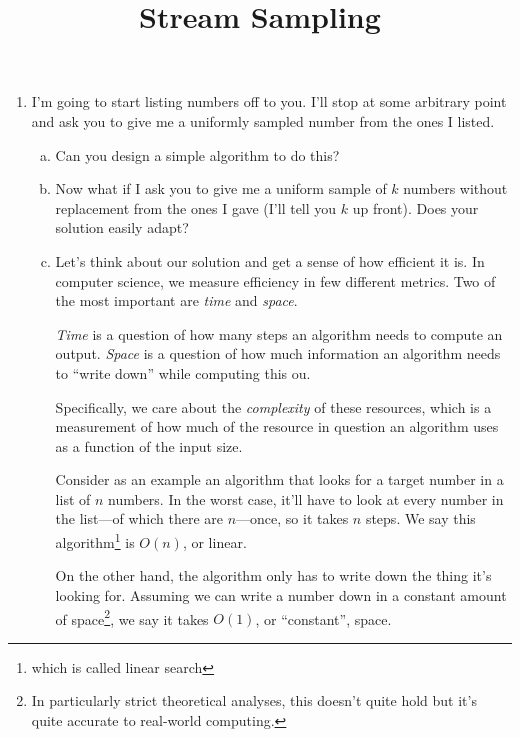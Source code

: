 \documentclass{article}
\title{Stream Sampling}
\author{}
\date{}
\begin{document}
\maketitle
\thispagestyle{fancy}

\doublespacing

\begin{enumerate}[1.]
\item %
  I'm going to start listing numbers off to you. I'll stop at some arbitrary
  point and ask you to give me a uniformly sampled number from the ones I
  listed.
  \begin{enumerate}[a.]
  \item %
    Can you design a simple algorithm to do this?
  \item %
    Now what if I ask you to give me a uniform sample of $k$ numbers without
    replacement from the ones I gave (I'll tell you $k$ up front). Does your
    solution easily adapt?

  \item %
    Let's think about our solution and get a sense of how efficient it is. In
    computer science, we measure efficiency in few different metrics. Two of the
    most important are \textit{time} and \textit{space}.

    \smallskip

    \textit{Time} is a question of how many steps an algorithm needs to
    compute an output. \textit{Space} is a question of how much information an
    algorithm needs to ``write down'' while computing this ou.

    \smallskip

    Specifically, we care about the \textit{complexity} of these resources, which
    is a measurement of how much of the resource in question an algorithm uses
    as a function of the input size.

    \smallskip

    Consider as an example an algorithm that looks for a target number in a list
    of $n$ numbers. In the worst case, it'll have to look at every number in the
    list---of which there are $n$---once, so it takes $n$ steps. We say this
    algorithm\footnote{which is called linear search} is $O(n)$, or linear.
    \smallskip

    On the other hand, the algorithm only has to write down the thing it's
    looking for. Assuming we can write a number down in a constant amount of
    space\footnote{In particularly strict theoretical analyses, this doesn't
      quite hold but it's quite accurate to real-world computing.}, we say it
    takes $O(1)$, or ``constant'', space.
    

\end{enumerate}
\end{enumerate}
\end{document}
